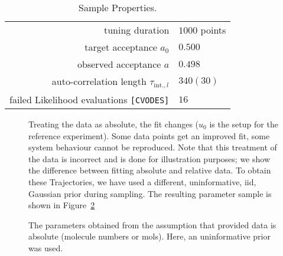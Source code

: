 \documentclass[english]{scrartcl}
\begin{document}
\begin{table}
  \centering
  \begin{tabular}{rl}
    \toprule
    tuning duration& $1000$ points\\
    target acceptance $a_0$&$0.500$\\
    observed acceptance $a$&$0.498$\\
    auto-correlation length $\tau_{\text{int.},l}$&$340(30)$\\
    failed Likelihood evaluations \texttt{[CVODES]}&$16$\\
    \bottomrule
  \end{tabular}
  \caption{Sample Properties.\label{tab:sp}}
\end{table}

\begin{figure}
  \centering
  \hspace*{-3cm}
  \sffamily\tiny
  \caption{Treating the data as absolute, the fit changes ($u_0$ is
    the setup for the reference experiment). Some data points get an
    improved fit, some system behaviour cannot be reproduced. Note
    that this treatment of the data is incorrect and is done for
    illustration purposes; we show the difference between fitting
    absolute and relative data. To obtain these Trajectories, we have
    used a different, uninformative, iid, Gaussian prior during
    sampling. The resulting parameter sample is shown in
    Figure~\ref{fig:AbsoluteSample}}
  \label{fig:AbsoluteFit}
\end{figure}

\begin{figure}
  \centering 
  
  \caption{The parameters obtained from the assumption that provided
    data is absolute (molecule numbers or mols). Here, an
    uninformative prior was used.}
  \label{fig:AbsoluteSample}
\end{figure}
\end{document}
